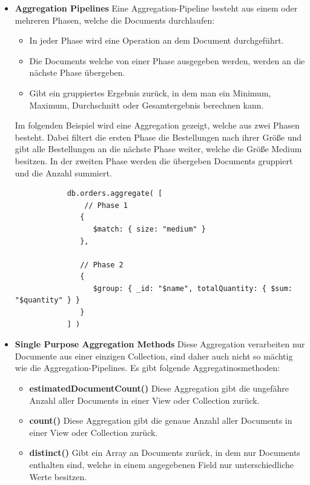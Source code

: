 \begin{itemize}
    \item \textbf{Aggregation Pipelines}
        \newline
         Eine Aggregation-Pipeline besteht aus einem oder mehreren Phasen, welche die Documents durchlaufen:
        \begin{itemize}
            \item In jeder Phase wird eine Operation an dem Document durchgeführt.
            \item Die Documents welche von einer Phase ausgegeben werden, werden an die nächste Phase übergeben.
            \item Gibt ein gruppiertes Ergebnis zurück, in dem man ein Minimum, Maximum, Durchschnitt oder Gesamtergebnis berechnen kann.
        \end{itemize}
        Im folgenden Beispiel wird eine Aggregation gezeigt, welche aus zwei Phasen besteht. Dabei filtert die ersten Phase die Bestellungen nach ihrer Größe und gibt alle Bestellungen an die nächste Phase weiter, welche die Größe Medium besitzen. In der zweiten Phase werden die übergeben Documents gruppiert und die Anzahl summiert.
        \begin{lstlisting}
            db.orders.aggregate( [
                // Phase 1
               {
                  $match: { size: "medium" }
               },
            
               // Phase 2
               {
                  $group: { _id: "$name", totalQuantity: { $sum: "$quantity" } }
               }
            ] )
        \end{lstlisting}
    \item \textbf{Single Purpose Aggregation Methods}
        \newline
        Diese Aggregation verarbeiten nur Documente aus einer einzigen Collection, sind daher auch nicht so mächtig wie die Aggregation-Pipelines. Es gibt folgende Aggregatinosmethoden:
        \begin{itemize}
            \item \textbf{estimatedDocumentCount()}
                \newline
                Diese Aggregation gibt die ungefähre Anzahl aller Documents in einer View oder Collection zurück.
            \item \textbf{count()}
                \newline
                Diese Aggregation gibt die genaue Anzahl aller Documents in einer View oder Collection zurück.
            \item \textbf{distinct()}
                \newline
                Gibt ein Array an Documents zurück, in dem nur Documents enthalten sind, welche in einem angegebenen Field nur unterschiedliche Werte besitzen.
        \end{itemize}
\end{itemize}
